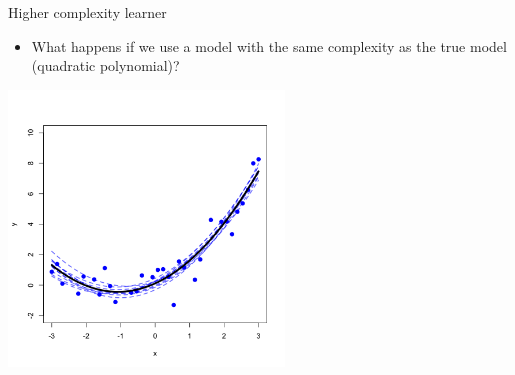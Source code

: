 \documentclass[11pt,compress,t,notes=noshow, xcolor=table]{beamer}
\begin{document}
\begin{vbframe} {Higher complexity learner}

\begin{itemize}
\item What happens if we use a model with the same complexity as the true model (quadratic polynomial)? 
\end{itemize}

\begin{center}
  \includegraphics[width = 0.55\textwidth]{figure/bias_variance_decomposition-correct_model.png}
\end{center}

\end{vbframe}
\end{document}
